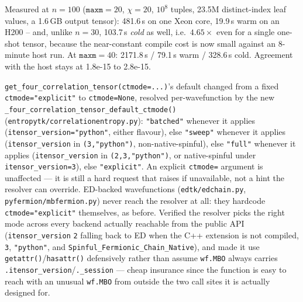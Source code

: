 \documentclass[11pt]{article}
\begin{document}
Measured at $n=100$ ($\texttt{maxm}=20$, $\chi=20$, $10^8$ tuples, 23.5M
distinct-index leaf values, a 1.6\,GB output tensor): 481.6\,s on one Xeon
core, 19.9\,s warm on an H200 -- and, unlike $n=30$, 103.7\,s \emph{cold} as
well, i.e.\ $4.65\times$ even for a single one-shot tensor, because the
near-constant compile cost is now small against an 8-minute host run. At
$\texttt{maxm}=40$: 2171.8\,s / 79.1\,s warm / 328.6\,s cold. Agreement with
the host stays at 1.8e-15 to 2.8e-15.



\texttt{get\_four\_correlation\_tensor(ctmode=...)}'s default changed
from a fixed \texttt{ctmode="explicit"} to \texttt{ctmode=None}, resolved
per-wavefunction by the new
\texttt{\_four\_correlation\_tensor\_default\_ctmode()}
(\texttt{entropytk/correlationentropy.py}): \texttt{"batched"} whenever it
applies (\texttt{itensor\_version="python"}, either flavour), else
\texttt{"sweep"} whenever it
applies (\texttt{itensor\_version} in \texttt{(3,"python")},
non-native-spinful), else \texttt{"full"} whenever it applies
(\texttt{itensor\_version} in \texttt{(2,3,"python")}, or native-spinful
under \texttt{itensor\_version=3}), else \texttt{"explicit"}. An explicit
\texttt{ctmode=} argument is unaffected --- it is still a hard request
that raises if unavailable, not a hint the resolver can override.
ED-backed wavefunctions (\texttt{edtk/edchain.py},
\texttt{pyfermion/mbfermion.py}) never reach the resolver at all: they
hardcode \texttt{ctmode="explicit"} themselves, as before. Verified the
resolver picks the right mode across every backend actually reachable
from the public API (\texttt{itensor\_version} \texttt{2} falling back
to ED when the C++ extension is not compiled, \texttt{3},
\texttt{"python"}, and \texttt{Spinful\_Fermionic\_Chain\_Native}), and
made it use \texttt{getattr()}/\texttt{hasattr()} defensively rather
than assume \texttt{wf.MBO} always carries
\texttt{.itensor\_version}/\texttt{.\_session} --- cheap insurance since
the function is easy to reach with an unusual \texttt{wf.MBO} from
outside the two call sites it is actually designed for.
\end{document}
